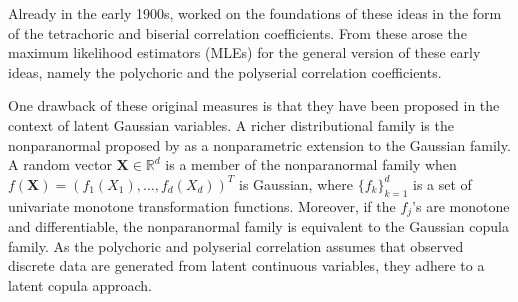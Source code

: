 Already in the early 1900s, \citet{Pearson1900, Pearson13} worked on the foundations of these ideas in the form of the tetrachoric and biserial correlation coefficients. From these arose the maximum likelihood estimators (MLEs) for the general version of these early ideas, namely the polychoric and the polyserial correlation coefficients.


One drawback of these original measures is that they have been proposed in the context of latent Gaussian variables.
A richer distributional family is the nonparanormal proposed by \citet{Liu09} as a nonparametric extension to the Gaussian family. A random vector $\boldsymbol{X} \in \mathbb{R}^d$ is a member of the nonparanormal family when $f(\boldsymbol{X}) = (f_{1}(X_{1}), \dots, f_{d}(X_{d}))^{T}$ is Gaussian, where $\{f_{k}\}_{k=1}^{d}$ is a set of univariate monotone transformation functions. Moreover, if the $f_j$'s are monotone and differentiable, the nonparanormal family is equivalent to the Gaussian copula family. As the polychoric and polyserial correlation assumes that observed discrete data are generated from latent continuous variables, they adhere to a latent copula approach.

